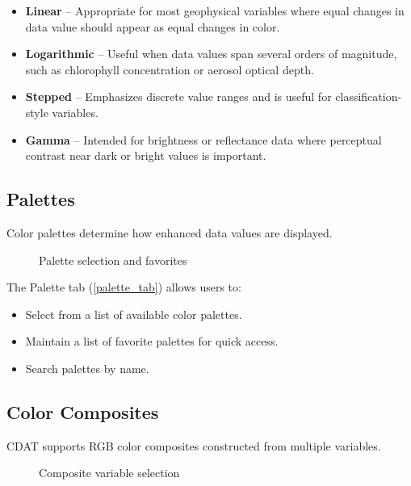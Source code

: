\begin{itemize}
  \item \textbf{Linear} -- Appropriate for most geophysical variables
        where equal changes in data value should appear as equal
        changes in color.
  \item \textbf{Logarithmic} -- Useful when data values span several
        orders of magnitude, such as chlorophyll concentration or
        aerosol optical depth.
  \item \textbf{Stepped} -- Emphasizes discrete value ranges and is
        useful for classification-style variables.
  \item \textbf{Gamma} -- Intended for brightness or reflectance data
        where perceptual contrast near dark or bright values is
        important.
\end{itemize}

\subsection{Palettes}

Color palettes determine how enhanced data values are displayed.

\begin{figure}
  \begin{center}
    \caption{Palette selection and favorites}
    \label{palette_tab}
  \end{center}
\end{figure}

The Palette tab (\autoref{palette_tab}) allows users to:
\begin{itemize}
  \item Select from a list of available color palettes.
  \item Maintain a list of favorite palettes for quick access.
  \item Search palettes by name.
\end{itemize}

\subsection{Color Composites}

CDAT supports RGB color composites constructed from multiple variables.

\begin{figure}
  \begin{center}
    \caption{Composite variable selection}
    \label{composite_tab}
  \end{center}
\end{figure}

